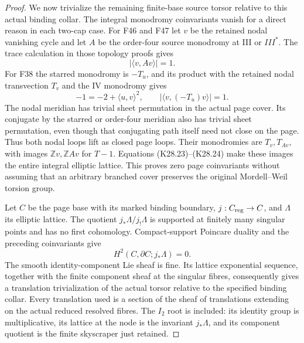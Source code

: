 \begin{proof}
We now trivialize the remaining finite-base source torsor relative
to this actual binding collar. The integral monodromy coinvariants
vanish for a direct reason in each two-cap case. For F46 and F47 let
\(v\) be the retained nodal vanishing cycle and let \(A\) be the
order-four source monodromy at III or \(III^*\). The trace calculation
in those topology proofs gives
\[
                          |\langle v,Av\rangle|=1.
 \tag{K28.23}
\]
For F38 the starred monodromy is \(-T_u\), and its product with
the retained nodal transvection \(T_v\) and the IV monodromy gives
\[
       -1=-2+\langle u,v\rangle^2,\qquad
       |\langle v,(-T_u)v\rangle|=1 .
 \tag{K28.24}
\]
The nodal meridian has trivial sheet permutation in the actual page
cover. Its conjugate by the starred or order-four meridian also
has trivial sheet permutation, even though that conjugating path
itself need not close on the page. Thus both nodal loops lift as
closed page loops. Their monodromies are \(T_v,T_{Av}\), with
images \(\mathbb Z v,\mathbb Z Av\) for \(T-1\). Equations
(K28.23)--(K28.24) make these images the entire integral elliptic
lattice. This proves zero page coinvariants without assuming that
an arbitrary branched cover preserves the original Mordell--Weil
torsion group.

Let \(C\) be the page base with its marked binding boundary,
\(j:C_{\rm reg}\to C\), and \(\Lambda\) its elliptic lattice.
The quotient \(j_*\Lambda/j_!\Lambda\) is supported at finitely
many singular points and has no first cohomology. Compact-support
Poincare duality and the preceding coinvariants give
\[
                  H^2(C,\partial C;j_*\Lambda)=0 .
 \tag{K28.25}
\]
The smooth identity-component Lie sheaf is fine. Its lattice
exponential sequence, together with the finite component sheaf
at the singular fibres, consequently gives a translation
trivialization of the actual torsor relative to the specified
binding collar. Every translation used is a section of the sheaf
of translations extending on the actual reduced resolved fibres.
The \(I_2\) root is included: its identity group is multiplicative,
its lattice at the node is the invariant \(j_*\Lambda\), and its
component quotient is the finite skyscraper just retained.


\end{proof}
